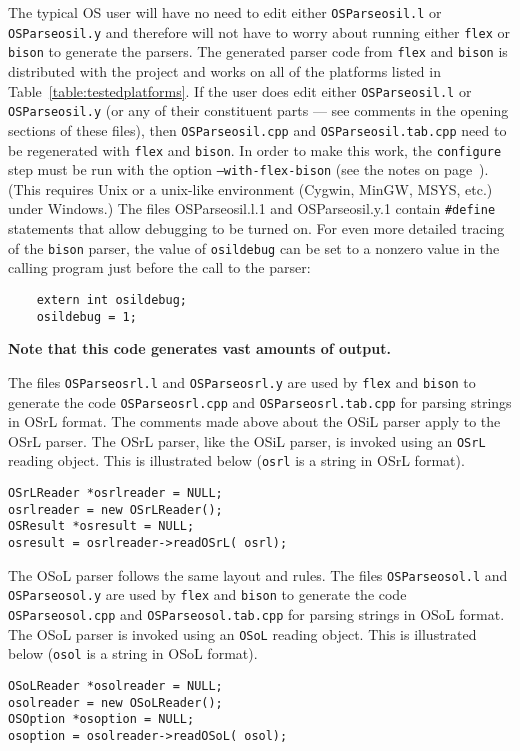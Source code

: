 \fi
The typical OS user will have no need to edit either {\tt OSParseosil.l} or {\tt OSParseosil.y} 
and therefore will not have to worry about running either {\tt flex} or {\tt bison} to generate the parsers.
\ifdevelop 
The generated parser code from {\tt flex} and {\tt bison} is distributed with the project and works on all 
of the platforms listed in Table~\ref{table:testedplatforms}.  If the user does edit either {\tt OSParseosil.l} 
or {\tt OSParseosil.y} (or any of their constituent parts --- see comments in the opening sections of these files), then {\tt OSParseosil.cpp} and {\tt OSParseosil.tab.cpp} need to be regenerated with 
{\tt flex} and {\tt bison}. In order to make this work, the {\tt configure} step must be run with the
option {\tt --with-flex-bison} (see the notes on page~\pageref{itemize:unixBuildNotes}).
%
(This requires Unix or a unix-like environment (Cygwin, MinGW, MSYS, etc.) under Windows.)
The files OSParseosil.l.1 and OSParseosil.y.1 contain {\tt \#define} statements that allow debugging to be turned on. For even more detailed tracing of the {\tt bison} parser, the value of {\tt osildebug} can be set to a nonzero value in the calling program just before the call to the parser:
\begin{verbatim}
    extern int osildebug;
    osildebug = 1;
\end{verbatim}
{\bf Note that this code generates vast amounts of output.}
\medskip
\fi

The files {\tt OSParseosrl.l} and {\tt OSParseosrl.y} are used by {\tt flex} and {\tt bison} to  
generate the code {\tt OSParseosrl.cpp} and {\tt OSParseosrl.tab.cpp} for parsing strings in OSrL format. The comments made above about the OSiL parser apply to the OSrL parser. 
\ifdevelop 
The OSrL parser, like the OSiL parser, is invoked using an {\tt OSrL} reading object.
This is illustrated below ({\tt osrl} is a string in OSrL format).
\begin{verbatim}
OSrLReader *osrlreader = NULL;
osrlreader = new OSrLReader();
OSResult *osresult = NULL;
osresult = osrlreader->readOSrL( osrl);
\end{verbatim}

\fi
The OSoL parser follows the same layout and rules.
The files {\tt OSParseosol.l} and {\tt OSParseosol.y} are used by {\tt flex} and {\tt bison} to  generate the code 
{\tt OSParseosol.cpp} and {\tt OSParseosol.tab.cpp} for parsing strings in OSoL format. 
\ifdevelop
The OSoL parser
is invoked using an {\tt OSoL} reading object.
This is illustrated below ({\tt osol} is a string in OSoL format).
\begin{verbatim}
OSoLReader *osolreader = NULL;
osolreader = new OSoLReader();
OSOption *osoption = NULL;
osoption = osolreader->readOSoL( osol);
\end{verbatim}


